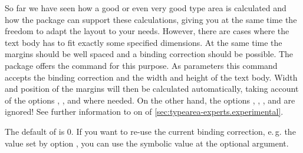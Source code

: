 \begin{Declaration}
\end{Declaration}%
So far we have seen how a good or even very good type area is
calculated and how the  package can support these
calculations, giving you at the same time the freedom to adapt the layout to
your needs.  However, there are cases where the text body has to fit exactly
some specified dimensions. At the same time the margins should be well spaced
and a binding correction should be possible. The  package
offers the command  for this purpose. As parameters this
command accepts the binding correction and the width and height of the text
body.  Width and position of the margins will then be calculated
automatically, taking account of the options
,
,
 and
 where needed.  On the other
hand, the options
,
,
, and
 are ignored!
See further information to  on
 of
\autoref{sec:typearea-experts.experimental}.

The default of  is 0. If you want to re-use the current
binding correction, e.\,g. the value set by option
, you can use the symbolic
value  at the optional argument.

